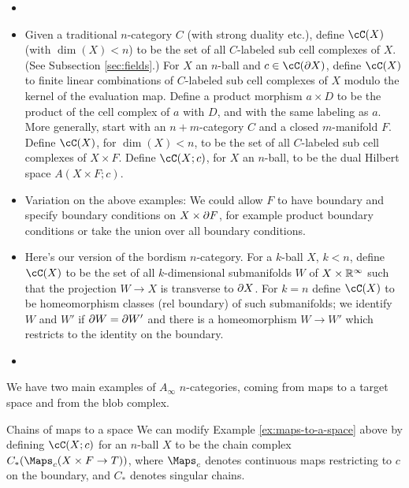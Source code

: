 \begin{itemize}

\item {}

\item Given a traditional $n$-category $C$ (with strong duality etc.),
define $\cC(X)$ (with $\dim(X) < n$) 
to be the set of all $C$-labeled sub cell complexes of $X$.
(See Subsection \ref{sec:fields}.)
For $X$ an $n$-ball and $c\in \cC(\bd X)$, define $\cC(X)$ to finite linear
combinations of $C$-labeled sub cell complexes of $X$
modulo the kernel of the evaluation map.
Define a product morphism $a\times D$ to be the product of the cell complex of $a$ with $D$,
and with the same labeling as $a$.
More generally, start with an $n{+}m$-category $C$ and a closed $m$-manifold $F$.
Define $\cC(X)$, for $\dim(X) < n$,
to be the set of all $C$-labeled sub cell complexes of $X\times F$.
Define $\cC(X; c)$, for $X$ an $n$-ball,
to be the dual Hilbert space $A(X\times F; c)$.

\item Variation on the above examples:
We could allow $F$ to have boundary and specify boundary conditions on $X\times \partial F$,
for example product boundary conditions or take the union over all boundary conditions.

\item Here's our version of the bordism $n$-category.
For a $k$-ball $X$, $k<n$, define $\cC(X)$ to be the set of all $k$-dimensional
submanifolds $W$ of $X\times \mathbb{R}^\infty$ such that the projection $W \to X$ is transverse
to $\partial X$.
For $k=n$ define $\cC(X)$ to be homeomorphism classes (rel boundary) of such submanifolds;
we identify $W$ and $W'$ if $\partial W = \partial W'$ and there is a homeomorphism
$W\to W'$ which restricts to the identity on the boundary.

\item {}

\end{itemize}


We have two main examples of $A_\infty$ $n$-categories, coming from maps to a target space and from the blob complex.

\begin{example}{Chains of maps to a space}
We can modify Example \ref{ex:maps-to-a-space} above by defining $\cC(X; c)$ for an $n$-ball $X$  to be the chain complex 
$C_*(\Maps_c(X\times F \to T))$, where $\Maps_c$ denotes continuous maps restricting to $c$ on the boundary,
and $C_*$ denotes singular chains.
\end{example}

